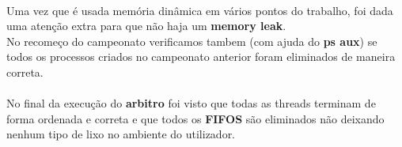 \documentclass[letterpaper, 11pt]{article}
\begin{document}
\paragraph{}
Uma vez que é usada memória dinâmica em vários pontos do trabalho, foi dada uma atenção extra para que não haja um \textbf{memory leak}.\\
No recomeço do campeonato verificamos tambem (com ajuda do \textbf{ps aux}) se todos os processos criados no campeonato anterior foram eliminados de maneira correta.
\paragraph{}
No final da execução do \textbf{arbitro} foi visto que todas as threads terminam de forma ordenada e correta e que todos os \textbf{FIFOS} são eliminados não deixando nenhum tipo de lixo no ambiente do utilizador.
\end{document}
